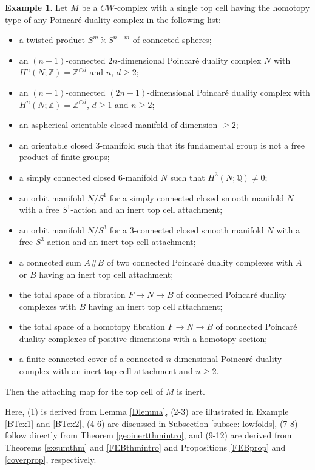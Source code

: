 \documentclass[a4]{amsart}
\theoremstyle{definition}
\newtheorem{example}[theorem]{Example}
\begin{document}
\begin{sloppypar}
\begin{example}\label{Huaex}
Let $M$ be a $CW$-complex with a single top cell having the homotopy type of any Poincar\'{e} duality complex in the following list: 
\begin{itemize}
\item[(1).] a twisted product $S^{m}\widetilde{\times} S^{n-m}$ of connected spheres; 
\item[(2).] an $(n-1)$-connected $2n$-dimensional Poincar\'{e} duality complex $N$ with $H^n(N;\mathbb{Z})=\mathbb{Z}^{\oplus d}$ and $n$, $d\geq 2$;
\item[(3).] an $(n-1)$-connected $(2n+1)$-dimensional Poincar\'{e} duality complex with $H^n(N;\mathbb{Z})=\mathbb{Z}^{\oplus d}$, $d\geq 1$ and $n\geq 2$;
\item[(4).] an aspherical orientable closed manifold of dimension $\geq 2$;
\item[(5).] an orientable closed $3$-manifold such that its fundamental group is not a free product of finite groups;
\item[(6).] a simply connected closed $6$-manifold $N$ such that $H^3(N;\mathbb{Q})\neq 0$;
\item[(7).] an orbit manifold $N/S^1$ for a simply connected closed smooth manifold $N$ with a free $S^1$-action and an inert top cell attachment;
\item[(8).] an orbit manifold $N/S^3$ for a $3$-connected closed smooth manifold $N$ with a free $S^3$-action and an inert top cell attachment;
\item[(9).] a connected sum $A\#B$ of two connected Poincar\'{e} duality complexes with $A$ or $B$ having an inert top cell attachment; 
\item[(10).] the total space of a fibration $F\stackrel{}{\longrightarrow} N\stackrel{}{\longrightarrow} B$ of connected Poincar\'{e} duality complexes with $B$ having an inert top cell attachment; 
\item[(11).] the total space of a homotopy fibration $F\stackrel{}{\longrightarrow} N\stackrel{}{\longrightarrow} B$ of connected Poincar\'{e} duality complexes of positive dimensions with a homotopy section; 
\item[(12).] a finite connected cover of a connected $n$-dimensional Poincar\'{e} duality complex with an inert top cell attachment and $n\geq 2$. 
\end{itemize}
Then the attaching map for the top cell of $M$ is inert. 

Here, (1) is derived from Lemma \ref{Dlemma}, (2-3) are illustrated in Example \ref{BTex1} and \ref{BTex2}, (4-6) are discussed in Subsection \ref{subsec: lowfolds}, (7-8) follow directly from Theorem \ref{geoinertthmintro}, and (9-12) are derived from Theorems \ref{exsumthm} and \ref{FEBthmintro} and Propositions \ref{FEBprop} and \ref{coverprop}, respectively.  
\end{example}




\end{sloppypar}
\end{document}
